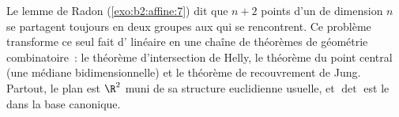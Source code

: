 \begin{problem}\label{pb:b2:affine:1}
Le lemme de Radon (\cref{exo:b2:affine:7}) dit que $n + 2$
points d'un  de dimension $n$ se partagent toujours en
deux groupes aux  qui se rencontrent. Ce problème
transforme ce seul fait d' linéaire en une chaîne de théorèmes
de géométrie combinatoire~: le théorème d'intersection de Helly, le
théorème du point central (une médiane bidimensionnelle) et le
théorème de recouvrement de Jung. Partout, le plan est $\R^2$ muni de
sa structure euclidienne usuelle, et $\det$ est le  dans
la base canonique.


\end{problem}
